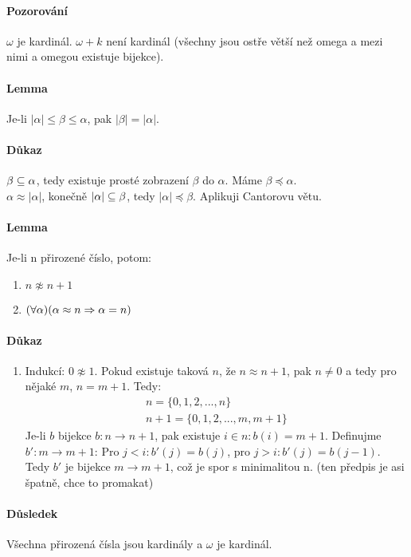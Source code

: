 \documentclass[a4paper,12pt,titlepage]{article}
\begin{document}
\paragraph{Pozorování}
$\omega$ je kardinál. $\omega + k$ není kardinál (všechny jsou ostře větší než
omega a mezi nimi a omegou existuje bijekce).
\paragraph{Lemma}
 Je-li $|\alpha| \le \beta \le \alpha$, pak $|\beta| = |\alpha|$.
\paragraph{Důkaz}
$\beta\subseteq \alpha$, tedy existuje prosté zobrazení $\beta$ do $\alpha$. Máme
$\beta \preceq \alpha$. \\
$\alpha \approx |\alpha|$, konečně $|\alpha| \subseteq \beta$, tedy $|\alpha| \preceq
\beta$. Aplikuji Cantorovu větu.
\paragraph{Lemma}
Je-li n přirozené číslo, potom:
\begin{enumerate}
	\item $n \napprox n+1$
	\item $(\forall \alpha)(\alpha \approx n \Rightarrow \alpha = n)$
\end{enumerate}
\paragraph{Důkaz}
\begin{enumerate}
	\item Indukcí: $0 \napprox 1$. Pokud existuje taková $n$, že $n\approx n+1$,
	pak $n \neq 0$ a tedy pro nějaké $m$, $n = m+1$. Tedy:
	\begin{align}
		n = \{0, 1, 2, ..., n\} \\
		n+1 = \{0, 1, 2, ..., m, m+1 \}
	\end{align}
	Je-li $b$ bijekce $b: n \to n+1$, pak existuje $i \in n: b(i) = m+1$.
	Definujme $b': m \to m+1$: Pro $j < i: b'(j) = b(j)$, pro $j > i: b'(j) =
	b(j-1)$. Tedy $b'$ je bijekce $m\to m+1$, což je spor s minimalitou n. (ten
	předpis je asi špatně, chce to promakat)
\end{enumerate}
\paragraph{Důsledek}
Všechna přirozená čísla jsou kardinály a $\omega$ je kardinál.
\end{document}
